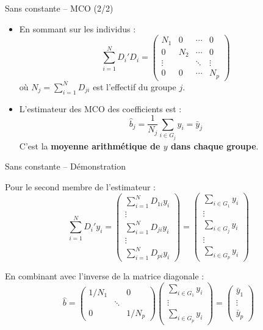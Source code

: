 \documentclass[11pt,aspectratio=169]{beamer}
\begin{document}
\begin{frame}{Sans constante -- MCO (2/2)}

\begin{itemize}

\item En sommant sur les individus :
  \[
  \sum_{i=1}^{N} D_i' D_i = \begin{pmatrix}
      N_1 & 0 & \cdots & 0 \\
      0 & N_2 & \cdots & 0 \\
      \vdots & & \ddots & \vdots \\
      0 & 0 & \cdots & N_p
  \end{pmatrix}
  \]
  où $N_j = \sum_{i=1}^{N} D_{ji}$ est l'effectif du groupe $j$.\newline

\item L'estimateur des MCO des coefficients est :
  \[
  \boxed{\hat{b}_j = \frac{1}{N_j} \sum_{i \in G_j} y_i = \bar{y}_j}
  \]
  C'est la \textbf{moyenne arithmétique de $y$ dans chaque groupe}.

\end{itemize}

\end{frame}

\begin{frame}{Sans constante -- Démonstration}

Pour le second membre de l'estimateur :
\[
\sum_{i=1}^{N} D_i' y_i = \begin{pmatrix}
    \sum_{i=1}^{N} D_{1i} y_i \\
    \vdots \\
    \sum_{i=1}^{N} D_{ji} y_i \\
    \vdots \\
    \sum_{i=1}^{N} D_{pi} y_i
\end{pmatrix} = \begin{pmatrix}
    \sum_{i \in G_1} y_i \\
    \vdots \\
    \sum_{i \in G_j} y_i \\
    \vdots \\
    \sum_{i \in G_p} y_i
\end{pmatrix}
\]

En combinant avec l'inverse de la matrice diagonale :
\[
\hat{b} = \begin{pmatrix}
    1/N_1 & & 0 \\
    & \ddots & \\
    0 & & 1/N_p
\end{pmatrix} \begin{pmatrix}
    \sum_{i \in G_1} y_i \\
    \vdots \\
    \sum_{i \in G_p} y_i
\end{pmatrix} = \begin{pmatrix}
    \bar{y}_1 \\
    \vdots \\
    \bar{y}_p
\end{pmatrix}
\]

\end{frame}
\end{document}
